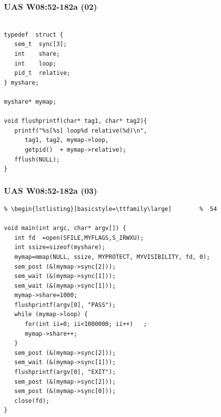 \documentclass[aspectratio=169, xcolor=table, notheorems, hyperref={pdfpagelabels=false}]{beamer}
\begin{document}
\begin{frame}[fragile]
\frametitle{UAS W08:52-182a (02)}
\begin{lstlisting}[basicstyle=\ttfamily\large]        %  54

typedef  struct {
   sem_t  sync[3];
   int    share;
   int    loop;
   pid_t  relative;
} myshare;

myshare* mymap;

void flushprintf(char* tag1, char* tag2){
   printf("%s[%s] loop%d relative(%d)\n", 
      tag1, tag2, mymap->loop, 
      getpid()  + mymap->relative);
   fflush(NULL);
}

\end{lstlisting}
\end{frame}

\begin{frame}[fragile]
\frametitle{UAS W08:52-182a (03)}
\begin{lstlisting}[basicstyle=\ttfamily\footnotesize] %  72
% \begin{lstlisting}[basicstyle=\ttfamily\small]        %  65
% \begin{lstlisting}[basicstyle=\ttfamily\large]        %  54

void main(int argc, char* argv[]) {
   int fd  =open(SFILE,MYFLAGS,S_IRWXU);
   int ssize=sizeof(myshare);
   mymap=mmap(NULL, ssize, MYPROTECT, MYVISIBILITY, fd, 0);
   sem_post (&(mymap->sync[2]));
   sem_wait (&(mymap->sync[1]));
   sem_wait (&(mymap->sync[1]));
   mymap->share=1000;
   flushprintf(argv[0], "PASS");
   while (mymap->loop) {
      for(int ii=0; ii<1000000; ii++)   ;
      mymap->share++;
   }
   sem_post (&(mymap->sync[2]));
   sem_wait (&(mymap->sync[1]));
   flushprintf(argv[0], "EXIT");
   sem_post (&(mymap->sync[2]));
   sem_post (&(mymap->sync[0]));
   close(fd);
}

\end{lstlisting}
\end{frame}

\end{document}

